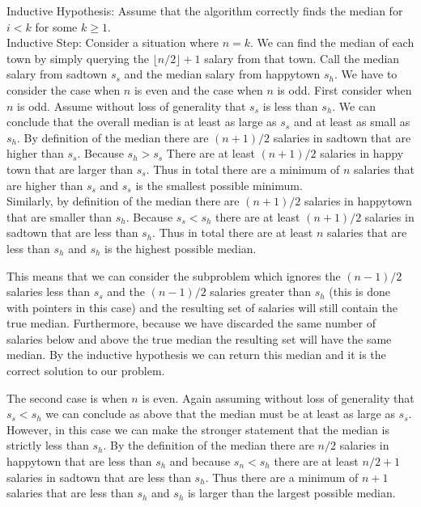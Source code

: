 \documentclass{article}
\begin{document}
Inductive Hypothesis: Assume that the algorithm correctly finds the median for $i < k$ for some $k \ge 1$.\\

Inductive Step: Consider a situation where $n = k$. We can find the median of each town by simply querying the $\lfloor n/2 \rfloor + 1$ salary from that town. Call the median salary from sadtown $s_s$ and the median salary from happytown $s_h$. We have to consider the case when $n$ is even and the case when $n$ is odd. First consider when $n$ is odd. Assume without loss of generality that $s_s$ is less than $s_h$. We can conclude that the overall median is at least as large as $s_s$ and at least as small as $s_h$. By definition of the median there are $(n+1)/2$ salaries in sadtown that are higher than $s_s$. Because $s_h > s_s$ There are at least $(n+1)/2$ salaries in happy town that are larger than $s_s$. Thus in total there are a minimum of $n$ salaries that are higher than $s_s$ and $s_s$ is the smallest possible minimum.\\

Similarly, by definition of the median there are $(n+1)/2$ salaries in happytown that are smaller than $s_h$. Because $s_s < s_h$ there are at least $(n+1)/2$ salaries in sadtown that are less than $s_h$. Thus in total there are at least $n$ salaries that are less than $s_h$ and $s_h$ is the highest possible median.

This means that we can consider the subproblem which ignores the $(n-1)/2$ salaries less than $s_s$ and the $(n-1)/2$ salaries greater than $s_h$ (this is done with pointers in this case) and the resulting set of salaries will still contain the true median. Furthermore, because we have discarded the same number of salaries below and above the true median the resulting set will have the same median. By the inductive hypothesis we can return this median and it is the correct solution to our problem.

The second case is when $n$ is even. Again assuming without loss of generality that $s_s < s_h$ we can conclude as above that the median must be at least as large as $s_s$. However, in this case we can make the stronger statement that the median is strictly less than $s_h$. By the definition of the median there are $n/2$ salaries in happytown that are less than $s_h$ and because $s_n < s_h$ there are at least $n/2 + 1$ salaries in sadtown that are less than $s_h$. Thus there are a minimum of $n+1$ salaries that are less than $s_h$ and $s_h$ is larger than the largest possible median. 
\end{document}
